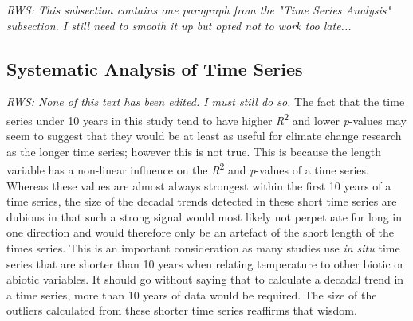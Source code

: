 \documentclass{ametsoc}
\begin{document}
\emph{RWS: This subsection contains one paragraph from the "Time Series Analysis" subsection. I still need to smooth it up but opted not to work too late...}
\subsection{Systematic Analysis of Time Series}

\emph{RWS: None of this text has been edited. I must still do so.}
The fact that the time series under 10 years in this study tend to have higher \emph{R}\textsuperscript{2} and lower \emph{p}-values may seem to suggest that they would be at least as useful for climate change research as the longer time series; however this is not true. This is because the length variable has a non-linear influence on the \emph{R}\textsuperscript{2} and \emph{p}-values of a time series. Whereas these values are almost always strongest within the first 10 years of a time series, the size of the decadal trends detected in these short time series are dubious in that such a strong signal would most likely not perpetuate for long in one direction and would therefore only be an artefact of the short length of the times series. This is an important consideration as many studies use \emph{in situ} time series that are shorter than 10 years when relating temperature to other biotic or abiotic variables. It should go without saying that to calculate a decadal trend in a time series, more than 10 years of data would be required. The size of the outliers calculated from these shorter time series reaffirms that wisdom.
\end{document}
